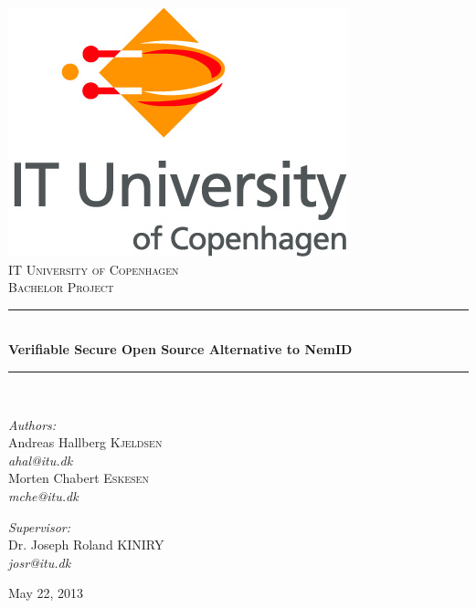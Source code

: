 \documentclass[twosided]{report}
\newcommand{\HRule}{\rule{\linewidth}{0.5mm}}
\begin{document}
\begin{titlepage}
\begin{center}

\includegraphics[scale=0.4]{images/ITULogo.jpg}\\[1cm]

\textsc{\LARGE IT University of Copenhagen}\\[1.5cm]

\textsc{\Large Bachelor Project}\\[0.5cm]


\HRule \\[0.4cm]
{\huge \bfseries Verifiable Secure Open Source Alternative to NemID}\\[0.1cm]
\HRule \\[1.5cm]

\begin{minipage}[t]{0.45\textwidth}
\begin{flushleft} \large
\emph{Authors:}
\\[10pt]
Andreas Hallberg \textsc{Kjeldsen}\\
\emph{ahal@itu.dk}
\\[10pt]
Morten Chabert \textsc{Eskesen}\\
\emph{mche@itu.dk}\\
\end{flushleft}
\end{minipage}
\begin{minipage}[t]{0.45\textwidth}
\begin{flushright} \large
\emph{Supervisor:}
\\[10pt]
Dr. Joseph Roland \textsc{KINIRY}\\
\emph{josr@itu.dk}
\end{flushright}
\end{minipage}

\vfill

{\large May 22, 2013}

\end{center}
\end{titlepage}
\end{document}
